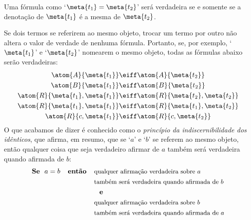 \begin{center}
Uma fórmula como `$\meta{t_1}=\meta{t_2}$' será verdadeira se e somente se a denotação de $\meta{t_1}$ é a mesma de $\meta{t_2}$.
\end{center}

Se dois termos se referirem ao mesmo objeto, trocar um termo por outro não altera o valor de verdade de nenhuma fórmula.
Portanto, se, por exemplo, `$\meta{t_1}$' e `$\meta{t_2}$' nomearem o mesmo objeto, todas as fórmulas abaixo serão verdadeiras:\label{model.nonidentity}
	\begin{align*}
		\atom{A}{\meta{t_1}} &\eiff \atom{A}{\meta{t_2}} \\
		\atom{B}{\meta{t_1}} &\eiff \atom{B}{\meta{t_2}}\\
		\atom{R}{\meta{t_1},\meta{t_1}} &\eiff \atom{R}{\meta{t_2},\meta{t_2}}\\
		\atom{R}{\meta{t_1},\meta{t_1}} & \eiff \atom{R}{\meta{t_1},\meta{t_2}}\\
		\atom{R}{c,\meta{t_1}} &\eiff \atom{R}{c,\meta{t_2}}\\
	\end{align*}
O que acabamos de dizer é conhecido como o \emph{princípio da indiscernibilidade dos idênticos}, que afirma, em resumo, que se `$a$' e `$b$' se referem ao mesmo objeto, então qualquer coisa que seja verdadeiro afirmar de $a$ também será verdadeira quando afirmada de $b$:	
\begin{align*} 
	\text{\textbf{Se} \ $a=b$ \textbf{ \ então \ } }&\text{\small qualquer afirmação verdadeira sobre $a$}\\
	&\text{\small também será verdadeira quando afirmada de $b$}\\
	&\text{\textbf{ \ e}}\\
	&\text{\small qualquer afirmação verdadeira sobre $b$}\\
	&\text{\small também será verdadeira quando afirmada de $a$}
\end{align*}



